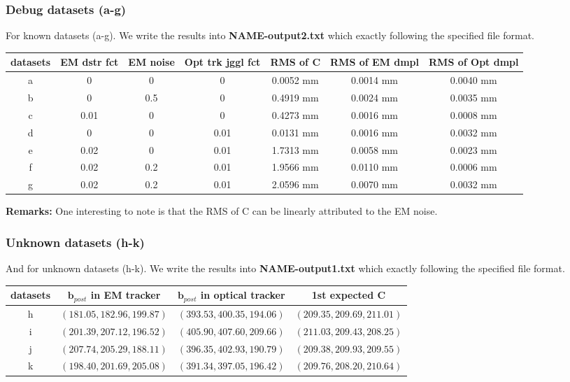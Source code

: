 \documentclass[english,10pt,a4paper]{book}
\begin{document}
    \subsubsection*{Debug datasets (a-g)}
    For known datasets (a-g). We write the results into \textbf{NAME-output2.txt} which exactly following the specified file format.
    \begin{center}
    	\begin{tabular}{|c|c|c|c|c|c|c|}
    		\hline
    		datasets & EM dstr fct & EM noise & Opt trk jggl fct & RMS of C & RMS of EM dmpl & RMS of Opt dmpl \\
    		\hline
    		a & 0 & 0 & 0 & 0.0052 mm & 0.0014 mm & 0.0040 mm \\
    		\hline
    		b & 0 & 0.5 & 0 & 0.4919 mm & 0.0024 mm & 0.0035 mm \\
    		\hline
    		c & 0.01 & 0 & 0 & 0.4273 mm & 0.0016 mm & 0.0008 mm \\
    		\hline
    		d & 0 & 0 & 0.01 & 0.0131 mm & 0.0016 mm & 0.0032 mm \\
    		\hline
    		e & 0.02 & 0 & 0.01 & 1.7313 mm & 0.0058 mm & 0.0023 mm \\
    		\hline
    		f & 0.02 & 0.2 & 0.01 & 1.9566 mm & 0.0110 mm & 0.0006 mm \\
    		\hline
    		g & 0.02 & 0.2 & 0.01 & 2.0596 mm & 0.0070 mm & 0.0032 mm \\
    		\hline
    	\end{tabular}
    \end{center}
    \textbf{Remarks:} One interesting to note is that the RMS of C can be linearly attributed to the EM noise.
    
    \subsubsection*{Unknown datasets (h-k)}
    And for unknown datasets (h-k). We write the results into \textbf{NAME-output1.txt}  which exactly following the specified file format.
    \begin{center}
    	\begin{tabular}{|c|c|c|c|}
    		\hline
    		datasets & \( \mathbf{b}_{post} \) in EM tracker & \( \mathbf{b}_{post} \) in optical tracker & 1st expected C \\
    		\hline
    		h & \((  181.05,	 182.96,	 199.87)\) & \((  393.53,	 400.35,	 194.06)\) & \((  209.35,	 209.69,	 211.01)\) \\
    		\hline
    		i & \((  201.39,	 207.12,	 196.52)\) & \((  405.90,	 407.60,	 209.66)\) & \((  211.03,	 209.43,	 208.25)\) \\
    		\hline
    		j & \((  207.74,	 205.29,	 188.11)\) & \((  396.35,	 402.93,	 190.79)\) & \((  209.38,	 209.93,	 209.55)\) \\
    		\hline
    		k & \((  198.40,	 201.69,	 205.08)\) & \((  391.34,	 397.05,	 196.42)\) & \((  209.76,	 208.20,	 210.64)\) \\
    		\hline
    	\end{tabular}
    \end{center}
    
\end{document}
